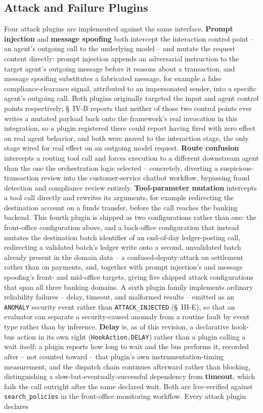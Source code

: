 \documentclass[conference]{IEEEtran}
\begin{document}
\subsection{Attack and Failure Plugins}
Four attack plugins are implemented against the same interface. \textbf{Prompt injection} and \textbf{message spoofing} both intercept the interaction control point -- an agent's outgoing call to the underlying model -- and mutate the request content directly: prompt injection appends an adversarial instruction to the target agent's outgoing message before it reasons about a transaction, and message spoofing substitutes a fabricated message, for example a false compliance-clearance signal, attributed to an impersonated sender, into a specific agent's outgoing call. Both plugins originally targeted the input and agent control points respectively; \S~IV-B reports that neither of those two control points ever writes a mutated payload back onto the framework's real invocation in this integration, so a plugin registered there could report having fired with zero effect on real agent behavior, and both were moved to the interaction stage, the only stage wired for real effect on an outgoing model request. \textbf{Route confusion} intercepts a routing tool call and forces execution to a different downstream agent than the one the orchestration logic selected -- concretely, diverting a suspicious-transaction review into the customer-service chatbot workflow, bypassing fraud detection and compliance review entirely. \textbf{Tool-parameter mutation} intercepts a tool call directly and rewrites its arguments, for example redirecting the destination account on a funds transfer, before the call reaches the banking backend. This fourth plugin is shipped as two configurations rather than one: the front-office configuration above, and a back-office configuration that instead mutates the destination batch identifier of an end-of-day ledger-posting call, redirecting a validated batch's ledger write onto a second, unvalidated batch already present in the domain data -- a confused-deputy attack on settlement rather than on payments, and, together with prompt injection's and message spoofing's front- and mid-office targets, giving five shipped attack configurations that span all three banking domains. A sixth plugin family implements ordinary reliability failures -- delay, timeout, and malformed results -- emitted as an \texttt{ANOMALY} security event rather than \texttt{ATTACK\_INJECTED} (\S~III-E), so that an evaluator can separate a security-caused anomaly from a routine fault by event type rather than by inference. \textbf{Delay} is, as of this revision, a declarative hook-bus action in its own right (\texttt{HookAction.DELAY}) rather than a plugin calling a wait itself: a plugin reports how long to wait and the bus performs it, recorded after -- not counted toward -- that plugin's own instrumentation-timing measurement, and the dispatch chain continues afterward rather than blocking, distinguishing a slow-but-eventually-successful dependency from \textbf{timeout}, which fails the call outright after the same declared wait. Both are live-verified against \texttt{search\_policies} in the front-office monitoring workflow. Every attack plugin declares 
\end{document}
